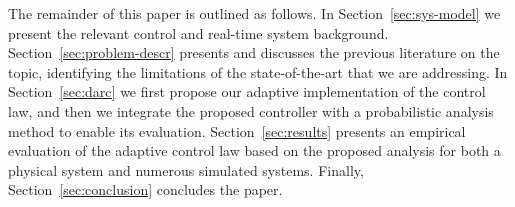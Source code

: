 The remainder of this paper is outlined as follows. 
In Section~\ref{sec:sys-model} we present the relevant control and real-time system background. 
Section~\ref{sec:problem-descr} presents and discusses the previous literature on the topic, identifying the limitations of the state-of-the-art that we are addressing.
In Section~\ref{sec:darc} we first propose our adaptive implementation of the control law, and then we integrate the proposed controller with a probabilistic analysis method to enable its evaluation.
Section~\ref{sec:results} presents an empirical evaluation of the adaptive control law based on the proposed analysis for both a physical system and numerous simulated systems.
Finally, Section~\ref{sec:conclusion} concludes the paper.
